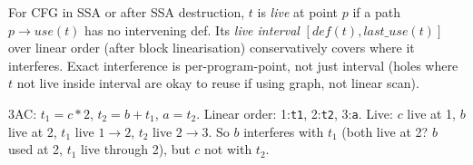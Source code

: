 \begin{definition}
For CFG in SSA or after SSA destruction, $t$ is \emph{live} at point $p$ if a path $p\to use(t)$ has no intervening def. Its \emph{live interval} $[def(t), last\_use(t)]$ over linear order (after block linearisation) conservatively covers where it interferes. Exact interference is per-program-point, not just interval (holes where $t$ not live inside interval are okay to reuse if using graph, not linear scan).
\end{definition}

\begin{example}[Intervals for \texttt{a=b+c*2}]
3AC: $t_1=c*2$, $t_2=b+t_1$, $a=t_2$. Linear order: 1:\texttt{t1}, 2:\texttt{t2}, 3:\texttt{a}. Live: $c$ live at 1, $b$ live at 2, $t_1$ live $1\to2$, $t_2$ live $2\to3$. So $b$ interferes with $t_1$ (both live at 2? $b$ used at 2, $t_1$ live through 2), but $c$ not with $t_2$.
\end{example}

